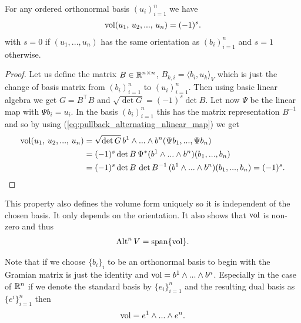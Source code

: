 \documentclass[../main.tex]{subfiles}
\begin{document}
\begin{proposition}
    For any ordered
    orthonormal basis $(u_i)_{i=1}^n$ we have 
    \begin{align*}
        \operatorname{vol} (u_1,\,u_2,...,\,u_n) = (-1)^s.
    \end{align*}
    with $s=0$ if $(u_1,...,u_n)$ has the same orientation as $(b_i)_{i=1}^n$ 
    and $s=1$ otherwise. 
\end{proposition}
\begin{proof}
    Let us define the matrix $B \in \mathbb{R}^{n\times n}$, $B_{k,i} = \langle b_i, u_k
    \rangle_V$ which is just the change of basis matrix from $( b_i )_{i=1}^n$ 
    to $( u_i )_{i=1}^n$. 
    Then using basic linear algebra we get
    $ G = B^\top B$ and 
    $\sqrt{\det G} = (-1)^s \det B$. Let now $\Psi$ be the linear map with 
    $\Psi b_i = u_i$. In the basis $( b_i )_{i=1}^n$ this has the matrix 
    representation $B^{-1}$ and so by using 
    (\ref{eq:pullback_alternating_nlinear_map}) we get
    \begin{align*}
        \operatorname{vol} (u_1,\,u_2,...,\,u_n) &= \sqrt{ \det G} \, b^1 \wedge ... \wedge b^n 
        ( \Psi b_1,..., \Psi b_n )
        \\ &= (-1)^s \det B \, \Psi^* (b^1 \wedge ... \wedge b^n )( b_1,..., b_n) 
        \\ &= (-1)^s \det B \, \det B^{-1} \, (b^1 \wedge ... \wedge b^n )( b_1,..., b_n)
        = (-1)^s.
    \end{align*}
\end{proof}
This property also defines the volume form uniquely so it is independent of the 
chosen basis. It only depends on the orientation.
It also shows that $\operatorname{vol}$ is non-zero and thus 
\begin{align*}
    {\text{Alt}^{n}\,V} = \text{span} \{ \operatorname{vol} \}.
\end{align*}

Note that if we choose $\{ b_i \}_{i}$ to be an orthonormal basis to begin 
with the Gramian matrix is just the identity and 
$\operatorname{vol} = b^1 \wedge ... \wedge b^n$. Especially in the case of $\mathbb{R}^n$ if 
we denote the standard basis by $\{ e_i \}_{i=1}^n$ and the resulting 
dual basis as $\{ e^i \}_{i=1}^n$ then 
\begin{align*}
    \operatorname{vol} = e^1 \wedge ... \wedge e^n.
\end{align*}
\end{document}
